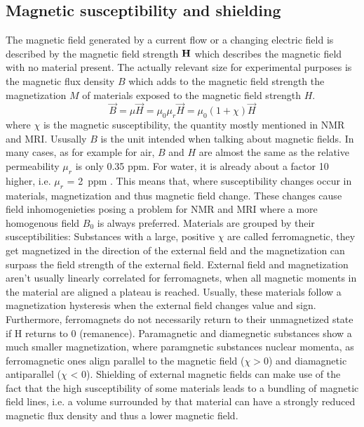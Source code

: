             \subsection{Magnetic susceptibility and shielding}
            The magnetic field generated by a current flow or a changing electric field is described by the magnetic field strength $\mathbf{H}$ which describes the magnetic field with no material present. The actually relevant size for experimental purposes is the magnetic flux density $B$ which adds to the magnetic field strength the magnetization $M$ of materials exposed to the magnetic field strength $H$.
            \begin{equation}
                \vec{B} = \mu \vec{H} = \mu_0 \mu_r \vec{H} = \mu_0(1+\chi) \vec{H}
            \end{equation}
            where $\chi$ is the magnetic susceptibility, the quantity mostly mentioned in NMR and MRI. Ususally $B$ is the unit intended when talking about magnetic fields. 
            In many cases, as for example for air, $B$ and $H$ are almost the same as the relative permeability $\mu_r$ is only 0.35 ppm\cite{CullityGrahamIntroductionToMagneticMaterials}. For water, it is already about a factor 10 higher, i.e. $\mu_r$ = 2~ppm . 
            This means that, where susceptibility changes occur in materials, magnetization and thus magnetic field change. These changes cause field inhomogenieties posing a problem for NMR and MRI where a more homogenous field $B_0$ is always preferred. Materials are grouped by their susceptibilities:
            Substances with a large, positive $\chi$ are called ferromagnetic, they get magnetized in the direction of the external field and the magnetization can surpass the field strength of the external field. External field and magnetization aren't usually linearly correlated for ferromagnets, when all magnetic moments in the material are aligned a plateau is reached. Usually, these materials follow a magnetization hysteresis when the external field changes value and sign. Furthermore, ferromagnets do not necessarily return to their unmagnetized state if H returns to 0 (remanence).
            Paramagnetic and diamegnetic substances show a much smaller magnetization, where paramgnetic substances nuclear momenta, as ferromagnetic ones align parallel to the magnetic field ($\chi>0$) and diamagnetic antiparallel ($\chi$ < 0).
            Shielding of external magnetic fields can make use of the fact that the high susceptibility of some materials leads to a bundling of magnetic field lines, i.e. a volume surrounded by that material can have a strongly reduced magnetic flux density and thus a lower magnetic field.
